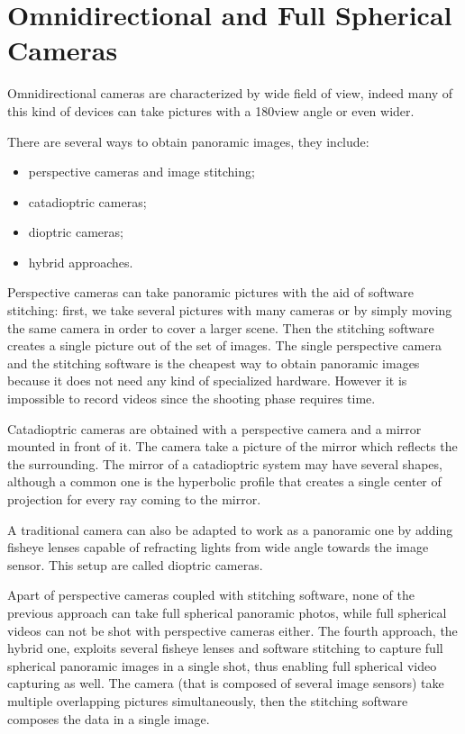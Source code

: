 \section{Omnidirectional and Full Spherical Cameras}
\label{sec:cameraclassification}
Omnidirectional cameras are characterized by wide field of view, 
indeed many of this kind
of devices can take pictures with a 180\degree view angle or even wider.

There are several ways to obtain panoramic images, they include:
\begin{itemize}
	\item perspective cameras and image stitching;
	\item catadioptric cameras;
	\item dioptric cameras;
	\item hybrid approaches.
\end{itemize}

Perspective cameras can take panoramic pictures with the aid of 
software stitching: first, we take several pictures with many cameras or by
simply moving 
the same camera in order to cover a larger scene. Then the stitching software 
creates a single picture out of the set of images.
The single perspective camera and the stitching software is the cheapest 
way to obtain panoramic images because it does not need any kind of specialized 
hardware. However it is impossible to record videos since the shooting phase 
requires time.

Catadioptric cameras are obtained with a perspective camera and a mirror 
mounted in front of it. 
The camera take a picture of the mirror which reflects the the 
surrounding. The mirror of a catadioptric system may have several shapes, 
although a common one is the hyperbolic profile that creates a single center of 
projection for every ray coming to the mirror.

A traditional camera can also be adapted to work as a panoramic one by adding
fisheye lenses capable of refracting lights from wide angle towards the 
image sensor. This setup are called dioptric cameras.

Apart of perspective cameras coupled with stitching software, none of the 
previous approach can take full spherical panoramic photos, while full spherical 
videos can not be shot with perspective cameras either.
The fourth approach, the hybrid one, exploits several fisheye lenses and 
software stitching to capture full spherical panoramic images in a single shot, 
thus enabling full spherical video capturing as well.
The camera (that is composed of several image sensors) take multiple 
overlapping pictures simultaneously, then the stitching software composes the
data in a single image.

